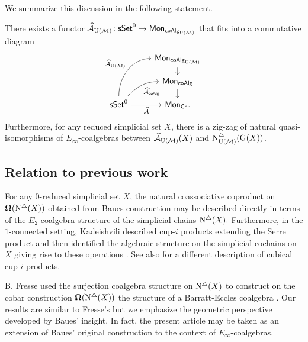 We summarize this discussion in the following statement.

\begin{theorem} \label{t:2nd main thm in the intro} There exists a functor $\operatorname{\mathcal{\widehat{A}}}_{\operatorname{U}(\mathcal{M})} \colon \mathsf{sSet}^0 \to \mathsf{Mon}_{\mathsf{coAlg}_{\operatorname{U}(\mathcal{M})}}$ that fits into a commutative diagram
	\begin{equation*}
	\begin{tikzcd}[row sep=small]
	& \Mon_{\coAlg_\UM} \arrow[d] \\
	& \Mon_{\coAlg} \arrow[d] \\
	\sSet^0
	\arrow[r, "\Ahat"', ]
	\arrow[ru, "\Ahat_{\coAlg}"', out=45, in=180] 
	\arrow[ruu, "\Ahat_\UM", out=90, in=180]
	& \Mon_{\Ch}.
	\end{tikzcd}
	\end{equation*}
	Furthermore, for any reduced simplicial set $X$, there is a zig-zag of natural quasi-isomorphisms of $E_{\infty}$-coalgebras between $\operatorname{\mathcal{\widehat{A}}}_{\operatorname{U}(\mathcal{M})}(X)$ and $\operatorname{N^{\triangle}_{{\operatorname{U}(\mathcal{M})}}}(\operatorname{G}(X))$.
\end{theorem}

\subsection*{Relation to previous work}

For any $0$-reduced simplicial set $X$, the natural coassociative coproduct on $\operatorname{\mathbf{\Omega}} (\operatorname{N^{\triangle}} (X))$ obtained from Baues construction may be described directly in terms of the $E_2$-coalgebra structure of the simplicial chains $\operatorname{N^{\triangle}}(X).$ Furthermore, in the $1$-connected setting, Kadeishvili described cup-$i$ products extending the Serre product and then identified the algebraic structure on the simplicial cochains on $X$ giving rise to these operations \cite{kadeishvili1999coproducts, kadeishvili2003cup-i}.
See also \cite{pilarczyk2016cubical} for a different description of cubical cup-$i$ products.

B. Fresse used the surjection coalgebra structure on $\operatorname{N^{\triangle}}(X)$ to construct on the cobar construction $\operatorname{\mathbf{\Omega}}(\operatorname{N^{\triangle}}(X))$ the  structure of a Barratt-Eccles coalgebra \cite{fresse2003hopf}.
Our results are similar to Fresse's but we emphasize the geometric perspective developed by Baues' insight.
In fact, the present article may be taken as an extension of Baues' original construction to the context of $E_{\infty}$-coalgebras.

